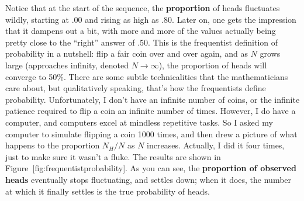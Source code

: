 \documentclass[]{book}
\begin{document}
Notice that at the start of the sequence, the \textbf{proportion} of heads fluctuates wildly, starting at .00 and rising as high as .80. Later on, one gets the impression that it dampens out a bit, with more and more of the values actually being pretty close to the ``right'' answer of .50. This is the frequentist definition of probability in a nutshell: flip a fair coin over and over again, and as \(N\) grows large (approaches infinity, denoted \(N\rightarrow \infty\)), the proportion of heads will converge to 50\%. There are some subtle technicalities that the mathematicians care about, but qualitatively speaking, that's how the frequentists define probability. Unfortunately, I don't have an infinite number of coins, or the infinite patience required to flip a coin an infinite number of times. However, I do have a computer, and computers excel at mindless repetitive tasks. So I asked my computer to simulate flipping a coin 1000 times, and then drew a picture of what happens to the proportion \(N_H / N\) as \(N\) increases. Actually, I did it four times, just to make sure it wasn't a fluke. The results are shown in Figure~{[}fig:frequentistprobability{]}. As you can see, the \textbf{proportion of observed heads} eventually stops fluctuating, and settles down; when it does, the number at which it finally settles is the true probability of heads.
\end{document}
